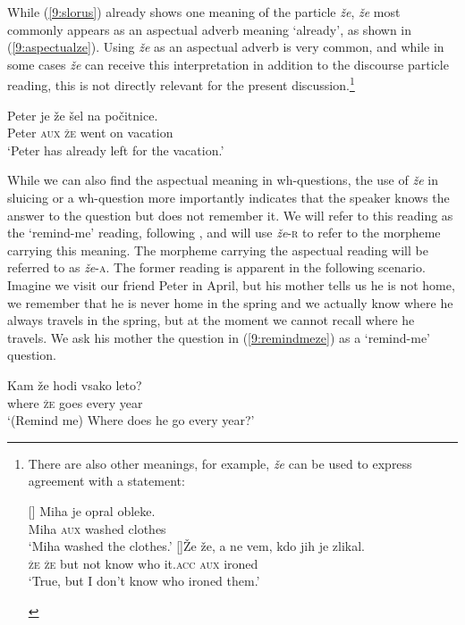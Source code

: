\documentclass[output=paper,
modfonts,
newtxmath,
hidelinks
]{langscibook}
\begin{document}
\noindent While (\ref{9:slorus}) already shows one meaning of the particle \textit{že}, \textit{že} most commonly appears as an aspectual adverb meaning `already', as shown in (\ref{9:aspectualze}). Using \textit{že} as an aspectual adverb is very common, and while in some cases \textit{že} can receive this interpretation in addition to the discourse particle reading, this is not directly relevant for the present discussion.\footnote{There are also other meanings, for example, \textit{že} can be used to express agreement with a statement:

\ea
\begin{xlist}
[]{
\gll Miha je opral obleke.\\ 
Miha \textsc{aux} washed clothes\\
\glt `Miha washed the clothes.'}
[]{\gll Že že, a ne vem, kdo jih je zlikal.\\ 
\textsc{že} \textsc{že}	but not know who it.\textsc{acc} \textsc{aux} ironed\\
\glt `True, but I don't know who ironed them.'}
\end{xlist}
\zlast
}

\begin{exe} 
\ex \label{9:aspectualze}
\gll Peter 	je že šel na počitnice. \\
	Peter   \textsc{aux} \textsc{že} went on vacation\\
\trans `Peter has already left for the vacation.' 
\end{exe}

\noindent While we can also find the aspectual meaning in wh-questions, the use of \textit{že} in sluicing or a wh-question more importantly indicates that the speaker knows the answer to the question but does not remember it. We will refer to this reading as the `remind-me' reading, following \cite{sauerland2014wieder}, and will use \textit{že}-\textsc{r} to refer to the morpheme carrying this meaning. The morpheme carrying the aspectual reading will be referred to as \textit{že}-\textsc{a}. The former reading is apparent in the following scenario. Imagine we visit our friend Peter in April, but his mother tells us he is not home, we remember that he is never home in the spring and we actually know where he always travels in the spring, but at the moment we cannot recall where he travels. We ask his mother the question in (\ref{9:remindmeze}) as a `remind-me' question.

\begin{exe}
\ex \label{9:remindmeze}
\gll Kam že hodi vsako leto?\\
	where \textsc{že} goes every year\\
	\trans `(Remind me) Where does he go every year?'
\end{exe}
\end{document}
